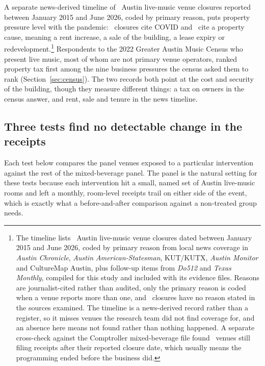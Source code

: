 A separate news-derived timeline of \NVenueClosuresDatedN\ Austin
live-music venue closures reported between January 2015 and June 2026, coded
by primary reason, puts property pressure level with the pandemic:
\NVenueClosuresCovid\ closures cite COVID and
\NVenueClosuresProperty\ cite a property cause, meaning a rent increase, a
sale of the building, a lease expiry or redevelopment.\footnote{The timeline
lists \NVenueClosuresDatedN\ Austin live-music venue closures dated between
January 2015 and June 2026, coded by primary reason from local news coverage
in \emph{Austin Chronicle}, \emph{Austin American-Statesman}, KUT/KUTX,
\emph{Austin Monitor} and CultureMap Austin, plus follow-up items from
\emph{Do512} and \emph{Texas Monthly}, compiled for this study and included
with its evidence files. Reasons are
journalist-cited rather than audited, only the primary reason is coded when a
venue reports more than one, and \NVenueClosuresNoReason\ closures have no
reason stated in the sources examined. The timeline is a news-derived record
rather than a register, so it misses venues the research team did not find
coverage for, and an absence here means not found rather than nothing happened.
A separate cross-check against the Comptroller mixed-beverage file found
\NVenueClosureCrossvalContinue\ venues still filing receipts after their
reported closure date, which usually means the programming ended before the
business did.} Respondents to the 2022 Greater Austin Music Census who present
live music, most of whom are not primary venue operators, ranked property tax
first among the nine business pressures the census asked them to rank
(Section~\ref{sec:census}). The two records both point at the cost and security
of the building, though they measure different things: a tax on owners in the
census answer, and rent, sale and tenure in the news timeline.

\subsection{Three tests find no detectable change in the receipts}

Each test below compares the panel venues exposed to a particular intervention
against the rest of the mixed-beverage panel. The panel is the natural setting
for these tests because each intervention hit a small, named set of Austin
live-music rooms and left a monthly, room-level receipts trail on either side
of the event, which is exactly what a before-and-after comparison against a
non-treated group needs.

